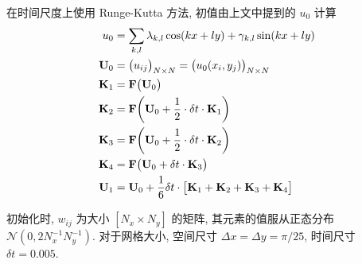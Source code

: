 在时间尺度上使用 Runge-Kutta 方法, 初值由上文中提到的 $u_0$ 计算
\[ \begin{aligned}
u_0 &= \sum_{k, l} \lambda_{k, l}\cos(kx+ly) + \gamma_{k, l}\sin(kx+ly) \\
{\mathbf U}_0 &= \bigl(u_{ij}\bigr)_{N \times N}
    = \bigl(u_0(x_i, y_j)\bigr)_{N \times N} \\
{\mathbf K}_1 &= {\mathbf F}\bigl({\mathbf U}_0\bigr) \\
{\mathbf K}_2 &= {\mathbf F}\biggl({\mathbf U}_0 + \frac{1}{2} \cdot\delta t \cdot {\mathbf K}_1\biggr) \\
{\mathbf K}_3 &= {\mathbf F}\biggl({\mathbf U}_0 + \frac{1}{2} \cdot\delta t \cdot {\mathbf K}_2\biggr) \\
{\mathbf K}_4 &= {\mathbf F}\bigl({\mathbf U}_0 + \delta t \cdot {\mathbf K}_3\bigr) \\
{\mathbf U}_1 &= {\mathbf U}_0 + \frac{1}{6}\delta t \cdot \bigl[
    {\mathbf K}_1 + {\mathbf K}_2 + {\mathbf K}_3 + {\mathbf K}_4 \bigr] \\
\end{aligned} \]

初始化时, $w_{ij}$ 为大小 $[N_x \times N_y]$ 的矩阵, 其元素的值服从正态分布
$\mathcal N(0, 2N_x^{-1}N_y^{-1})$. 对于网格大小, 空间尺寸
$\Delta x = \Delta y = \pi/25$, 时间尺寸 $\delta t = 0.005$.
\endinput
